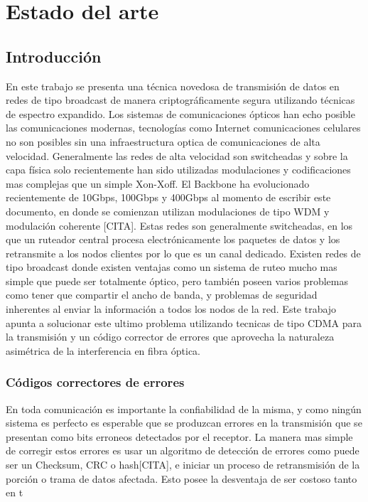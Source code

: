 \chapter{Estado del arte}

\section{Introducción}
En este trabajo se presenta una técnica novedosa de transmisión de datos en redes de tipo broadcast de manera criptográficamente segura utilizando técnicas de espectro expandido.
Los sistemas de comunicaciones ópticos han echo posible las comunicaciones modernas, tecnologías como Internet comunicaciones celulares no son posibles sin una infraestructura optica de comunicaciones de alta velocidad.
Generalmente las redes de alta velocidad son switcheadas y sobre la capa física solo recientemente han sido utilizadas modulaciones y codificaciones mas complejas que un simple Xon-Xoff.
El Backbone ha evolucionado recientemente de 10Gbps, 100Gbps y 400Gbps al momento de escribir este documento, en donde se comienzan utilizan modulaciones de tipo WDM y modulación coherente [CITA]. Estas redes son generalmente switcheadas, en los que un ruteador central procesa electrónicamente los paquetes de datos y los retransmite a los nodos clientes por lo que es un canal dedicado.
Existen redes de tipo broadcast donde existen ventajas como un sistema de ruteo mucho mas simple que puede ser totalmente óptico, pero también poseen varios problemas como tener que compartir el ancho de banda, y problemas de seguridad inherentes al enviar la información a todos los nodos de la red. Este trabajo apunta a solucionar este ultimo problema utilizando tecnicas de tipo CDMA para la transmisión y un código corrector de errores que aprovecha la naturaleza asimétrica de la interferencia en fibra óptica.

\subsection{Códigos correctores de errores}
En toda comunicación es importante la confiabilidad de la misma, y como ningún sistema es perfecto es esperable que se produzcan errores en la transmisión que se presentan como bits erroneos detectados por el receptor. 
La manera mas simple de corregir estos errores es usar un algoritmo de detección de errores como puede ser un Checksum, CRC o hash[CITA], e iniciar un proceso de retransmisión de la porción o trama de datos afectada. Esto posee la desventaja de ser costoso tanto en t



